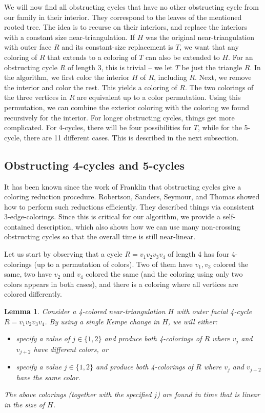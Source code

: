 \documentclass[10pt,a4paper]{article}
\newtheorem{lem}[thm]{Lemma}
\begin{document}
We will now find all obstructing cycles that have no other obstructing cycle from our family in their interior. They correspond to the leaves of the mentioned rooted tree. The idea is to recurse on their interiors, and replace the interiors with a constant size near-triangulation. If $H$ was the original near-triangulation with outer face $R$ and its constant-size replacement is $T$, we want that any coloring of $R$ that extends to a coloring of $T$ can also be extended to $H$. For an obstructing cycle $R$ of length 3, this is trivial -- we let $T$ be just the triangle $R$. In the algorithm, we first color the interior $H$ of $R$, including $R$. Next, we remove the interior and color the rest. This yields a coloring of $R$. The two colorings of the three vertices in $R$ are
equivalent up to a color permutation. Using this permutation, we can combine the exterior coloring with the coloring we found recursively for the interior.
For longer obstructing cycles, things get more complicated. For 4-cycles, there will be four possibilities for $T$, while for the 5-cycle, there are 11 different cases. This is described in the next subsection.


\subsection{Obstructing 4-cycles and 5-cycles}

It has been known since the work of Franklin \cite{Franklin1922} that obstructing cycles give a coloring reduction procedure. 
Robertson, Sanders, Seymour, and Thomas \cite{RSST-STOC} showed how to perform such reductions efficiently. They described things via consistent 3-edge-colorings. Since this is critical for our algorithm, we provide a self-contained description, which also shows how we can use many non-crossing obstructing cycles so that the overall time is still near-linear.

Let us start by observing that a cycle $R=v_1v_2v_3v_4$ of length 4 has four 4-colorings (up to a permutation of colors). Two of them have $v_1,v_3$ colored the same, two have $v_2$ and $v_4$ colored the same (and the coloring using only two colors appears in both cases), and there is a coloring where all vertices are colored differently.


\begin{lem} \label{lem:X4}
Consider a 4-colored near-triangulation $H$ with outer facial 4-cycle $R=v_1 v_2 v_3 v_4$. 
By using a single Kempe change in $H$, we will either:
\begin{itemize}
\item[(i)] specify a value of $j \in \{1,2\}$ and produce both 4-colorings of $R$ where $v_j$ and $v_{j+2}$ have different colors, or
\item[(ii)] specify a value $j \in \{1,2\}$ and produce both 4-colorings of $R$ where $v_j$ and $v_{j+2}$ have the same color.
\end{itemize}
The above colorings (together with the specified $j$) are found in time that is linear in the size of $H$.
\end{lem} 
\end{document}
